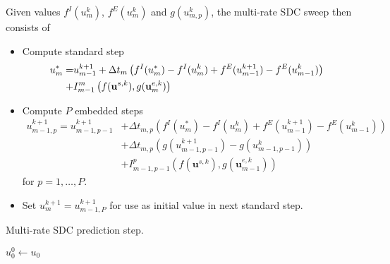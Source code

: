 \documentclass{article}
\newcommand{\ve}[1]{\mathbf{#1}}
\begin{document}
Given values $f^I(u^k_m)$, $f^E(u^k_m)$ and $g(u^k_{m,p})$, the multi-rate SDC sweep then consists of
\begin{itemize}
\item Compute standard step
	\begin{equation}
	\begin{aligned}
		u^{*}_{m} = & u^{k+1}_{m-1} + \Delta t_m \left( f^I(u^{*}_{m}) - f^I(u^k_{m}) + f^E(u^{k+1}_{m-1})-f^E(u^{k}_{m-1}) \right) \cr + & I_{m-1}^{m} \left( f(\ve{u}^{s,k}) , g(\ve{u}^{e,k}_m) \right)
    \end{aligned}
	\end{equation}
\item Compute $P$ embedded steps
	\begin{equation}
	\begin{aligned}
		u_{m-1,p}^{k+1} = u_{m-1,p-1}^{k+1} &+ \Delta t_{m,p} \left( f^I(u^{*}_{m}) - f^I(u^k_{m}) + f^E(u^{k+1}_{m-1})-f^E(u^{k}_{m-1}) \right) \\
			& + \Delta t_{m,p} \left( g(u^{k+1}_{m-1,p-1}) - g(u^k_{m-1,p-1}) \right) \\
			& + I_{m-1,p-1}^{p}  \left( f(\ve{u}^{s,k}) , g(\ve{u}^{e,k}_{m-1}) \right) 
	\end{aligned}
	\end{equation}
	for $p=1, \ldots, P$.
\item Set $u_{m}^{k+1} = u_{m-1,P}^{k+1}$ for use as initial value in next standard step.
\end{itemize}
%
%
%
\begin{algorithm2e}
	\caption{Multi-rate SDC prediction step.}
         $u^0_0 \leftarrow u_0$\\
\end{algorithm2e}
%
%
%
\end{document}
